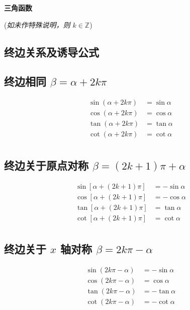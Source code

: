 \documentclass[a4paper, fleqn, fontset = mac]{ctexart}
\newcommand{\diform}{\noindent}
\begin{document}
	\begin{center}
		\textbf{\LARGE 三角函数} \par
		(\emph{如未作特殊说明，则 $k \in \mathbb{Z}$})
	\end{center}

	\begin{multicols}{2}
		\section{终边关系及诱导公式}
		\subsection{终边相同 $\beta = \alpha + 2k\pi$}
		\diform
		\begin{align*}
		\sin\left(\alpha+2k\pi\right)&=\sin\alpha \\
		\cos\left(\alpha+2k\pi\right)&=\cos\alpha \\
		\tan\left(\alpha+2k\pi\right)&=\tan\alpha \\
		\cot\left(\alpha+2k\pi\right)&=\cot\alpha \\
		\end{align*}
		
		\subsection{终边关于原点对称 $\beta = (2k+1)\pi+\alpha$}
		\diform
		\begin{align*}
		\sin\left[\alpha+\left(2k+1\right)\pi\right]&=-\sin\alpha \\
		\cos\left[\alpha+\left(2k+1\right)\pi\right]&=-\cos\alpha \\
		\tan\left[\alpha+\left(2k+1\right)\pi\right]&=\tan\alpha \\
		\cot\left[\alpha+\left(2k+1\right)\pi\right]&=\cot\alpha \\
		\end{align*}
		
		
		\subsection{终边关于 $ x $ 轴对称 $\beta = 2k \pi - \alpha$}
		\diform
		\begin{align*}
		\sin\left(2k\pi-\alpha\right)&=-\sin\alpha \\
		\cos\left(2k\pi-\alpha\right)&=\cos\alpha \\
		\tan\left(2k\pi-\alpha\right)&=-\tan\alpha \\
		\cot\left(2k\pi-\alpha\right)&=-\cot\alpha \\
		\end{align*}
		

\end{multicols}
\end{document}
